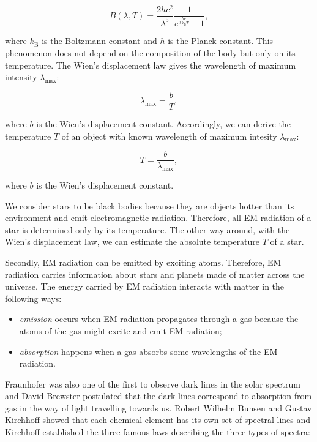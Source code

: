 \begin{equation}
	B(\lambda, T) = \frac{2 h c^2}{\lambda^5}
	\frac{1}{e^{\frac{hc}{\lambda k_{\mathrm{B}}T}} - 1},
\end{equation}

where \(k_{\mathrm{B}}\) is the Boltzmann constant 
and \(h\) is the Planck constant.
This phenomenon does not depend on the composition of the body
but only on its temperature.
The Wien's displacement law gives the wavelength of maximum intensity \(\lambda_{\max}\):

\begin{equation}
	\lambda_{\max} = \frac{b}{T},
\end{equation}

where \(b\) is the Wien's displacement constant.
Accordingly, we can derive the temperature \(T\) of an object
with known wavelength of maximum intesity \(\lambda_{\max}\):

\begin{equation}
	T = \frac{b}{\lambda_{\max}},
\end{equation}

where \(b\) is the Wien's displacement constant.~\cite{cochard2018}

We consider stars to be black bodies
because they are objects hotter than its environment
and emit electromagnetic radiation.
Therefore, all EM radiation of a star is determined only by its temperature.
The other way around, with the Wien's displacement law,
we can estimate the absolute temperature \(T\) of a star.~\cite{trypsteen2017}

Secondly, EM radiation can be emitted by exciting atoms.
Therefore, EM radiation carries information about stars and planets
made of matter across the universe.
The energy carried by EM radiation interacts with matter in the following ways:

\begin{itemize}
	\item \textit{emission} occurs when EM radiation propagates through a gas
		because the atoms of the gas might excite and emit EM radiation;
	\item \textit{absorption} happens when a gas absorbs some wavelengths
		of the EM radiation.
\end{itemize}

Fraunhofer was also one of the first to observe dark lines in the solar spectrum
and David Brewster postulated that the dark lines correspond to absorption from gas in the way of light travelling towards us.
Robert Wilhelm Bunsen and Gustav Kirchhoff showed that each chemical element has its own set of spectral lines
and Kirchhoff established the three famous laws describing the three types of spectra:

